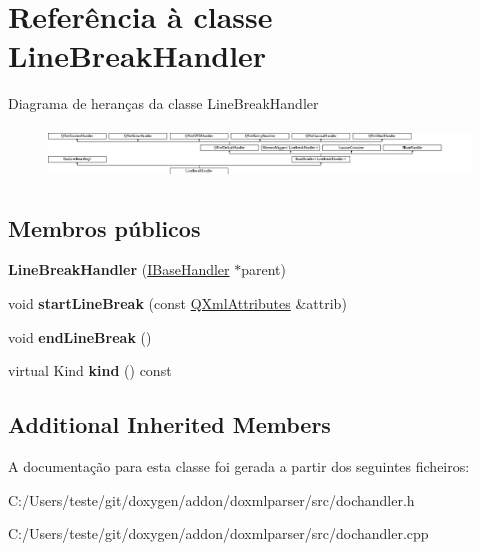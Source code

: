 \hypertarget{class_line_break_handler}{\section{Referência à classe Line\-Break\-Handler}
\label{class_line_break_handler}
}
Diagrama de heranças da classe Line\-Break\-Handler\begin{figure}[H]
\begin{center}
\leavevmode
\includegraphics[height=1.367521cm]{class_line_break_handler}
\end{center}
\end{figure}
\subsection*{Membros públicos}
\begin{DoxyCompactItemize}
\item 
\hypertarget{class_line_break_handler_a5bab92ffe05154d2ae9f634f8909fe7b}{{\bfseries Line\-Break\-Handler} (\hyperlink{class_i_base_handler}{I\-Base\-Handler} $\ast$parent)}\label{class_line_break_handler_a5bab92ffe05154d2ae9f634f8909fe7b}

\item 
\hypertarget{class_line_break_handler_a4ef850515992ba3cdd4e09897a4517c5}{void {\bfseries start\-Line\-Break} (const \hyperlink{class_q_xml_attributes}{Q\-Xml\-Attributes} \&attrib)}\label{class_line_break_handler_a4ef850515992ba3cdd4e09897a4517c5}

\item 
\hypertarget{class_line_break_handler_a985adfd59b8c8c55633a46ecb9893ef9}{void {\bfseries end\-Line\-Break} ()}\label{class_line_break_handler_a985adfd59b8c8c55633a46ecb9893ef9}

\item 
\hypertarget{class_line_break_handler_af8e62c8a81ddf2283205cc8955de50eb}{virtual Kind {\bfseries kind} () const }\label{class_line_break_handler_af8e62c8a81ddf2283205cc8955de50eb}

\end{DoxyCompactItemize}
\subsection*{Additional Inherited Members}


A documentação para esta classe foi gerada a partir dos seguintes ficheiros\-:\begin{DoxyCompactItemize}
\item 
C\-:/\-Users/teste/git/doxygen/addon/doxmlparser/src/dochandler.\-h\item 
C\-:/\-Users/teste/git/doxygen/addon/doxmlparser/src/dochandler.\-cpp\end{DoxyCompactItemize}
